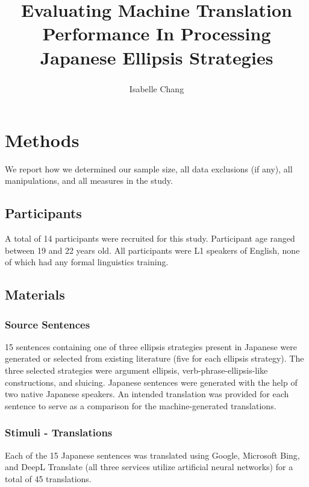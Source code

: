 \documentclass[
  man,floatsintext]{apa6}
\title{Evaluating Machine Translation Performance In Processing Japanese Ellipsis Strategies}
\author{Isabelle Chang\textsuperscript{}}
\date{}
\affiliation{\vspace{0.5cm}\textsuperscript{1} Rutgers University}
\begin{document}
\maketitle

\hypertarget{methods}{%
\section{Methods}\label{methods}}

We report how we determined our sample size, all data exclusions (if any), all manipulations, and all measures in the study.

\hypertarget{participants}{%
\subsection{Participants}\label{participants}}

A total of 14 participants were recruited for this study. Participant age ranged between 19 and 22 years old. All participants were L1 speakers of English, none of which had any formal linguistics training.

\hypertarget{materials}{%
\subsection{Materials}\label{materials}}

\hypertarget{source-sentences}{%
\subsubsection{Source Sentences}\label{source-sentences}}

15 sentences containing one of three ellipsis strategies present in Japanese were generated or selected from existing literature (five for each ellipsis strategy). The three selected strategies were argument ellipsis, verb-phrase-ellipsis-like constructions, and sluicing. Japanese sentences were generated with the help of two native Japanese speakers. An intended translation was provided for each sentence to serve as a comparison for the machine-generated translations.

\hypertarget{stimuli---translations}{%
\subsubsection{Stimuli - Translations}\label{stimuli---translations}}

Each of the 15 Japanese sentences was translated using Google, Microsoft Bing, and DeepL Translate (all three services utilize artificial neural networks) for a total of 45 translations.
\end{document}
